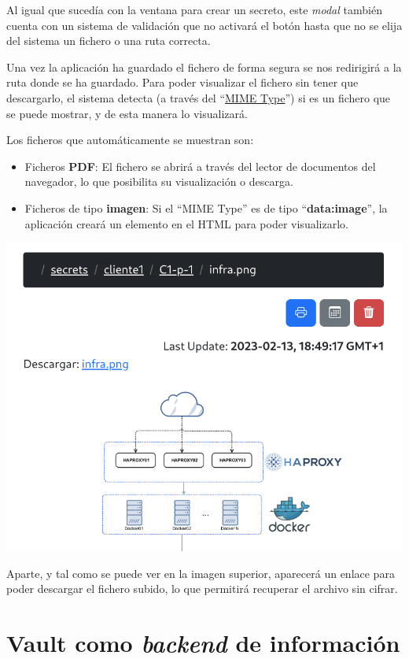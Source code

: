 \documentclass{\ClassPath/viu-tfm-template}
\begin{document}
Al igual que sucedía con la ventana para crear un secreto, este \textit{modal} también cuenta con un sistema de validación que no activará el botón hasta que no se elija del sistema un fichero o una ruta correcta.

Una vez la aplicación ha guardado el fichero de forma segura se nos redirigirá a la ruta donde se ha guardado. Para poder visualizar el fichero sin tener que descargarlo, el sistema detecta (a través del “\href{https://en.wikipedia.org/wiki/Media_type}{MIME Type}”) si es un fichero que se puede mostrar, y de esta manera lo visualizará.

Los ficheros que automáticamente se muestran son:

\begin{itemize}
    \item Ficheros \textbf{PDF}: El fichero se abrirá a través del lector de documentos del navegador, lo que posibilita su visualización o descarga.
    \item Ficheros de tipo \textbf{imagen}: Si el “MIME Type” es de tipo “\textbf{data:image}”, la aplicación creará un elemento en el HTML para poder visualizarlo.
\end{itemize}

\begin{center}
    \includegraphics[frame,width=0.7\linewidth]{img/upload_download.png}
\end{center}

Aparte, y tal como se puede ver en la imagen superior, aparecerá un enlace para poder descargar el fichero subido, lo que permitirá recuperar el archivo sin cifrar.


\section{Vault como \textit{backend} de información}
\end{document}
